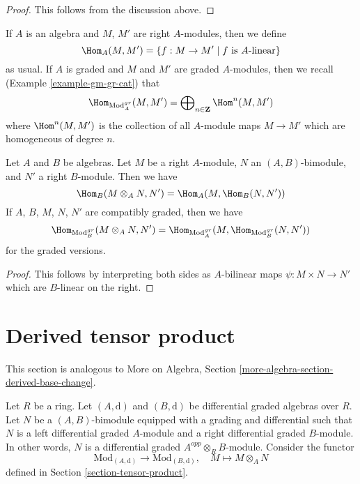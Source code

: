 \begin{proof}
This follows from the discussion above.
\end{proof}

\noindent
If $A$ is an algebra and $M$, $M'$ are right $A$-modules, then we
define
$$
\Hom_A(M, M') = \{f : M \to M'\mid f \text{ is }A\text{-linear}\}
$$
as usual. If $A$ is graded and $M$ and $M'$ are graded $A$-modules,
then we recall (Example \ref{example-gm-gr-cat}) that
$$
\Hom_{\text{Mod}_A^{gr}}(M, M') =
\bigoplus\nolimits_{n \in \mathbf{Z}} \Hom^n(M, M')
$$
where $\Hom^n(M, M')$ is the collection of all $A$-module maps
$M \to M'$ which are homogeneous of degree $n$.

\begin{lemma}
\label{lemma-tensor-hom-adjunction}
Let $A$ and $B$ be algebras. Let $M$ be a right $A$-module, $N$ an
$(A, B)$-bimodule, and $N'$ a right $B$-module. Then we have
$$
\Hom_B(M \otimes_A N, N') = \Hom_A(M, \Hom_B(N, N'))
$$
If $A$, $B$, $M$, $N$, $N'$ are compatibly graded, then we have
$$
\Hom_{\text{Mod}_B^{gr}}(M \otimes_A N, N') =
\Hom_{\text{Mod}_A^{gr}}(M, \Hom_{\text{Mod}_B^{gr}}(N, N'))
$$
for the graded versions.
\end{lemma}

\begin{proof}
This follows by interpreting both sides as $A$-bilinear maps
$\psi : M \times N \to N'$ which are $B$-linear on the right.
\end{proof}





\section{Derived tensor product}
\label{section-base-change}

\noindent
This section is analogous to More on Algebra, Section
\ref{more-algebra-section-derived-base-change}.

\medskip\noindent
Let $R$ be a ring. Let $(A, \text{d})$ and $(B, \text{d})$ be
differential graded algebras over $R$. Let $N$ be a $(A, B)$-bimodule
equipped with a grading and differential such that $N$ is a left
differential graded $A$-module and a right differential graded $B$-module.
In other words, $N$ is a differential graded $A^{opp} \otimes_R B$-module.
Consider the functor
\begin{equation}
\label{equation-bc}
\text{Mod}_{(A, \text{d})}
\longrightarrow
\text{Mod}_{(B, \text{d})},\quad
M \longmapsto M \otimes_A N
\end{equation}
defined in Section \ref{section-tensor-product}.

